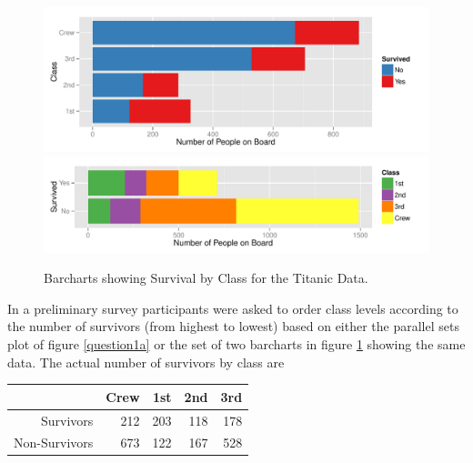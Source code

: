 \begin{figure}[hbtp]
\begin{center}
\includegraphics[width=.8\linewidth]{images/bar1-titanic}
\includegraphics[width=.8\linewidth]{images/bar2-titanic}
\end{center}
\caption{\label{question1b} Barcharts showing Survival by Class for the Titanic Data.}
\end{figure}



In a preliminary survey participants were asked to order class  levels according to the number of survivors (from highest to lowest) based on  either the parallel sets plot of figure \ref{question1a} or the set of two barcharts in figure \ref{question1b} showing the same data.  The actual number of survivors by class are
%
\begin{center}
\begin{tabular}{rrrrr}
& Crew & 1st & 2nd & 3rd \\ \hline
Survivors & 212 & 203 & 118 & 178\\
Non-Survivors & 673 & 122 & 167 &  528  
\end{tabular}
\end{center}


